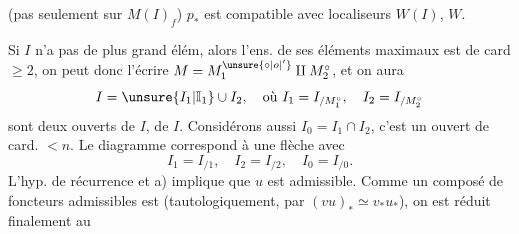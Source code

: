 (pas seulement sur $M(I)_f$) $p_*$ est compatible avec localiseurs $W(I)$, $W$.

Si $I$ n'a pas de plus grand élém, alors l'ens.  de ses éléments maximaux est de card $\geq2$, on peut donc l'écrire $M=M_1^{\unsure{\circ|o|'}}\amalg M_2^\circ$, et on aura
\[
I=\unsure{I_1|\mathbb I_1}\cup I_2,\quad\text{où }I_1=I_{/M_1^\circ},\quad I_2=I_{/M_2^\circ}
\]
sont deux ouverts de $I$,  de $I$.  Considérons aussi $I_0=I_1\cap I_2$, c'est un ouvert de card. $<n$. Le diagramme
correspond à une flèche
avec
\[
I_1=I_{/1},\quad I_2=I_{/2},\quad I_0=I_{/0}.
\]
L'hyp. de récurrence et a) implique que $u$ est admissible. Comme un composé de foncteurs admissibles est  (tautologiquement, par $(vu)_*\simeq v_*u_*$), on est réduit finalement au
